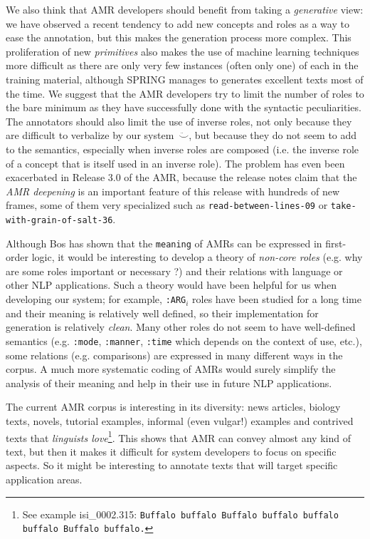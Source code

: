 \documentclass[12pt]{article}
\newcommand{\systeme}[1]{\textsc{#1}}
\newcommand{\spring}{\systeme{SPRING}}
\newcommand{\representation}[1]{\textsf{#1}}
\newcommand{\AMR}{\representation{AMR}}
\begin{document}
We also think that \AMR{} developers should benefit from taking a \emph{generative} view: we have observed  a recent tendency to add new concepts and roles as a way to ease the annotation, but this makes the generation process more complex. This proliferation of new \emph{primitives} also makes the use of machine learning techniques more difficult as there are only very few instances (often only one) of each in the training material, although \spring{} manages to generates excellent texts most of the time.   We suggest that the \AMR{} developers try to limit the number of roles to the bare minimum as they have successfully done with the syntactic peculiarities. The annotators should also limit the use of inverse roles, not only because they are difficult to verbalize by our system~$\ddot\smile$, but because they do not seem to add to the semantics, especially when inverse roles are composed (i.e. the inverse role of a concept that is itself used in an inverse role). The problem has even been exacerbated in Release 3.0 of the AMR, because the release notes claim that the \emph{AMR deepening} is an important feature of this release with hundreds of new frames, some of them very specialized such as \texttt{read-between-lines-09} or \texttt{take-with-grain-of-salt-36}.

Although Bos has shown that the \texttt{meaning} of \AMR{}s can be expressed in first-order logic, it would be interesting to develop a theory of \emph{non-core roles} (e.g. why are some roles important or necessary ?) and their relations with language or other NLP applications. Such a theory would have been helpful for us when developing our system; for example, \texttt{:ARG$_i$} roles have been studied for a long time and their meaning is relatively well defined, so their implementation for generation is relatively \emph{clean}. Many other roles do not seem to have well-defined semantics (e.g. \texttt{:mode}, \texttt{:manner}, \texttt{:time} which depends on the context of use, etc.), some relations (e.g. comparisons) are expressed in many different ways in the corpus. A much more systematic coding of \AMR{}s would surely simplify the analysis of their meaning and help in their use in future NLP applications.

The current \AMR{} corpus is interesting in its diversity: news articles, biology texts, novels, tutorial examples, informal (even vulgar!) examples and contrived texts that \emph{linguists love}\footnote{See example isi\_0002.315: \texttt{Buffalo buffalo Buffalo buffalo buffalo buffalo Buffalo buffalo.}}. This shows that \AMR{} can convey almost any kind of text, but then it makes it difficult for system developers to focus on specific aspects. So it might be interesting to annotate texts that will target specific application areas.
\end{document}
